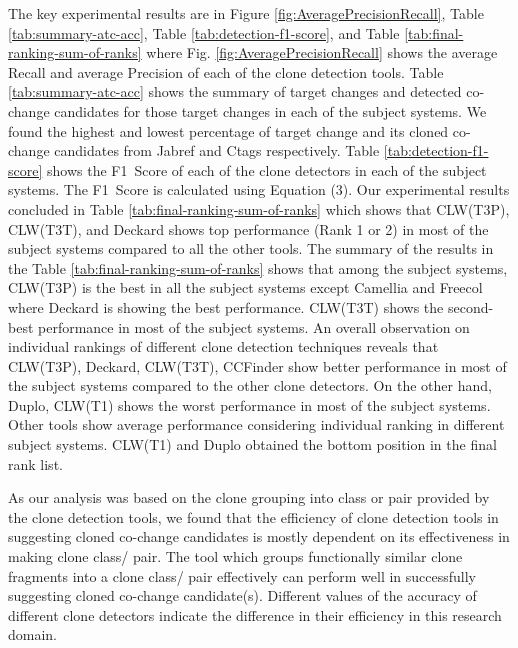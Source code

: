 \documentclass[review]{elsarticle}
\begin{document}
The key experimental results are in Figure \ref{fig:AveragePrecisionRecall}, Table \ref{tab:summary-atc-acc}, Table \ref{tab:detection-f1-score}, and Table \ref{tab:final-ranking-sum-of-ranks} where Fig. \ref{fig:AveragePrecisionRecall} shows the average Recall and average Precision of each of the clone detection tools. Table \ref{tab:summary-atc-acc} shows the summary of target changes and detected co-change candidates for those target changes in each of the subject systems.  We found the highest and lowest percentage of target change and its cloned co-change candidates from Jabref and Ctags respectively. Table \ref{tab:detection-f1-score} shows the F1~Score of each of the clone detectors in each of the subject systems. The F1~Score is calculated using Equation (3). Our experimental results concluded in Table \ref{tab:final-ranking-sum-of-ranks} which shows that CLW(T3P), CLW(T3T), and Deckard shows top performance (Rank 1 or 2) in most of the subject systems compared to all the other tools. The summary of the results in the Table \ref{tab:final-ranking-sum-of-ranks} shows that among the subject systems, CLW(T3P) is the best in all the subject systems except Camellia and Freecol where Deckard is showing the best performance. CLW(T3T) shows the second-best performance in most of the subject systems. An overall observation on individual rankings of different clone detection techniques reveals that CLW(T3P), Deckard, CLW(T3T), CCFinder show better performance in most of the subject systems compared to the other clone detectors. On the other hand, Duplo, CLW(T1) shows the worst performance in most of the subject systems. Other tools show average performance considering individual ranking in different subject systems.  CLW(T1) and Duplo obtained the bottom position in the final rank list. 

As our analysis was based on the clone grouping into class or pair provided by the clone detection tools, we found that the efficiency of clone detection tools in suggesting cloned co-change candidates is mostly dependent on its effectiveness in making clone class/ pair. The tool which groups functionally similar clone fragments into a clone class/ pair effectively can perform well in successfully suggesting cloned co-change candidate(s). Different values of the accuracy of different clone detectors indicate the difference in their efficiency in this research domain. 
\end{document}

